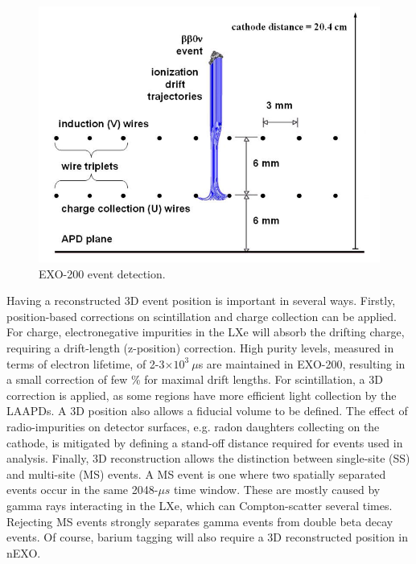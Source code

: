 \begin{figure} %
	\centering
	\includegraphics[width=.7\textwidth]{figures/anodecathodedriftcharges.png}
	\caption{EXO-200 event detection.  }
\label{fig:detectionplane}
\end{figure}

Having a reconstructed 3D event position is important in several ways.  Firstly, position-based corrections on scintillation and charge collection can be applied.  For charge, electronegative impurities in the LXe will absorb the drifting charge, requiring a drift-length (z-position) correction.  High purity levels, measured in terms of electron lifetime, of 2-3$\times 10^{3}~\mu$s are maintained in EXO-200, resulting in a small correction of few \% for maximal drift lengths.  For scintillation, a 3D correction is applied, as some regions have more efficient light collection by the LAAPDs.  A 3D position also allows a fiducial volume to be defined.  The effect of radio-impurities on detector surfaces, e.g. radon daughters collecting on the cathode, is mitigated by defining a stand-off distance required for events used in analysis.  Finally, 3D reconstruction allows the distinction between single-site (SS) and multi-site (MS) events.  A MS event is one where two spatially separated events occur in the same 2048-$\mu s$ time window.  These are mostly caused by gamma rays interacting in the LXe, which can Compton-scatter several times.  Rejecting MS events strongly separates gamma events from double beta decay events.  \cite{EXO200TwoNuLong}  Of course, barium tagging will also require a 3D reconstructed position in nEXO.


